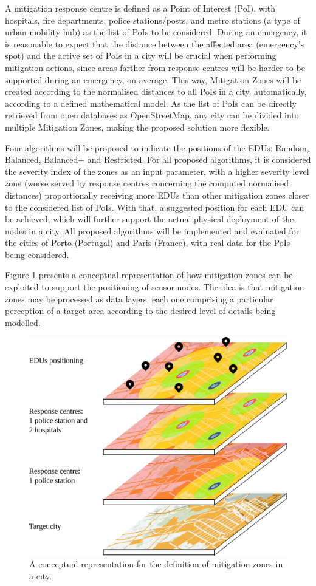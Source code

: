 \begin{refsection}
A mitigation response centre is defined as a Point of Interest (PoI), with hospitals, fire departments, police stations/posts, and metro stations (a type of urban mobility hub) as the list of PoIs to be considered. During an emergency, it is reasonable to expect that the distance between the affected area (emergency's spot) and the active set of PoIs in a city will be crucial when performing mitigation actions, since areas farther from response centres will be harder to be supported during an emergency, on average. This way, Mitigation Zones will be created according to the normalised distances to all PoIs in a city, automatically, according to a defined mathematical model. As the list of PoIs can be directly retrieved from open databases as OpenStreetMap, any city can be divided into multiple Mitigation Zones, making the proposed solution more flexible.

Four algorithms will be proposed to indicate the positions of the EDUs: Random, Balanced, Balanced+ and Restricted. For all proposed algorithms, it is considered the severity index of the zones as an input parameter, with a higher severity level zone (worse served by response centres concerning the computed normalised distances) proportionally receiving more EDUs than other mitigation zones closer to the considered list of PoIs. With that, a suggested position for each EDU can be achieved, which will further support the actual physical deployment of the nodes in a city. All proposed algorithms will be implemented and evaluated for the cities of Porto (Portugal) and Paris (France), with real data for the PoIs being considered. 

Figure \ref{fig:smartcity} presents a conceptual representation of how mitigation zones can be exploited to support the positioning of sensor nodes. The idea is that mitigation zones may be processed as data layers, each one comprising a particular perception of a target area according to the desired level of details being modelled.

\begin{figure}[htbp!]
  \centering
  \includegraphics[width=0.7\linewidth]{Chapters/2-EDUs/images/map_layers.pdf}
  \caption{A conceptual representation for the definition of mitigation zones in a city.}\label{fig:smartcity}
\end{figure}


\end{refsection}
